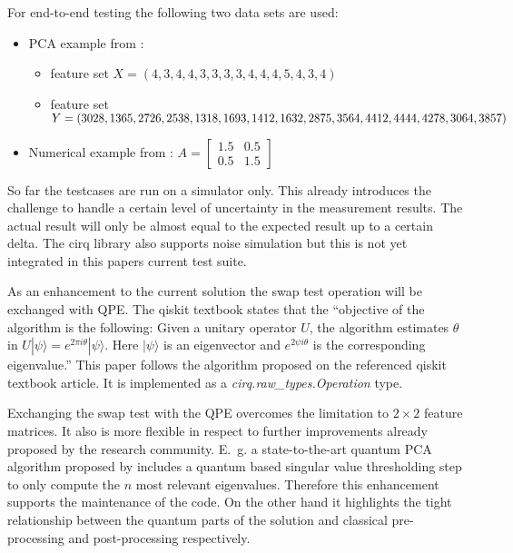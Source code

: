 For end-to-end testing the following two data sets are used:
\begin{itemize}
  \item PCA example from \cite{Lokho_2020}:
    \begin{itemize}
      \item feature set $X = (4, 3, 4, 4, 3, 3, 3, 3, 4, 4, 4, 5, 4, 3, 4)$
      \item feature set $Y = (3028, 1365, 2726, 2538, 1318, 1693, \\ 1412, 1632, 2875, 3564, 4412, 4444, 4278, 3064, 3857)$
    \end{itemize}
  \item Numerical example from \cite{He_2021}: $A = \begin{bmatrix} 1.5 & 0.5 \\ 0.5 & 1.5 \end{bmatrix}$
\end{itemize}
So far the testcases are run on a simulator only. This already introduces the challenge to handle a certain level of uncertainty in the measurement results. The actual result will only be almost equal to the expected result up to a certain delta. The cirq library also supports noise simulation but this is not yet integrated in this papers current test suite.

As an enhancement to the current solution the swap test operation will be exchanged with QPE. The qiskit textbook states that the \enquote{objective of the algorithm is the following: Given a unitary operator $U$, the algorithm estimates $\theta$ in $U|\psi\rangle = e^{2\pi i\theta}|\psi\rangle$. Here $|\psi\rangle$ is an eigenvector and $e^{2\psi i\theta}$ is the corresponding eigenvalue.}\cite{Qtb_Qpe} This paper follows the algorithm proposed on the referenced qiskit textbook article. It is implemented as a \emph{cirq.raw\_types.Operation} type.

Exchanging the swap test with the QPE overcomes the limitation to $2 \times 2$ feature matrices. It also is more flexible in respect to further improvements already proposed by the research community. E.~g. a state-to-the-art quantum PCA algorithm proposed by \cite{He_2021} includes a quantum based singular value thresholding step to only compute the $n$ most relevant eigenvalues. Therefore this enhancement supports the maintenance of the code. On the other hand it highlights the tight relationship between the quantum parts of the solution and classical pre-processing and post-processing respectively.
